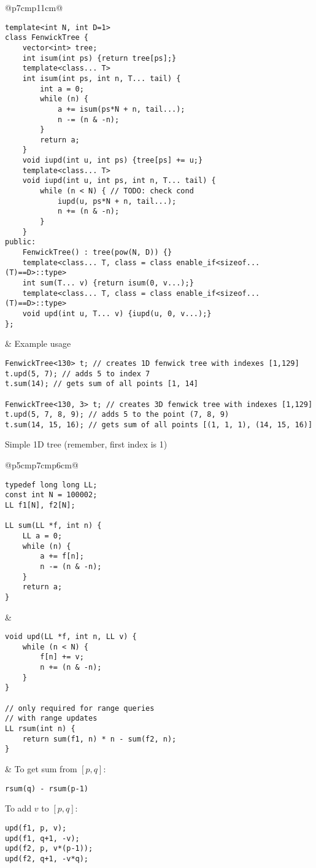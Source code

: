 \documentclass[letterpaper]{article}
\begin{document}
\begin{tabular}{@{}p{7cm}p{11cm}@{}}
\vspace*{-1em}
\begin{lstlisting}
template<int N, int D=1>
class FenwickTree {
	vector<int> tree;
	int isum(int ps) {return tree[ps];}
	template<class... T>
	int isum(int ps, int n, T... tail) {
		int a = 0;
		while (n) {
			a += isum(ps*N + n, tail...);
			n -= (n & -n);
		}
		return a;
	}
	void iupd(int u, int ps) {tree[ps] += u;}
	template<class... T>
	void iupd(int u, int ps, int n, T... tail) {
		while (n < N) { // TODO: check cond
			iupd(u, ps*N + n, tail...);
			n += (n & -n);
		}
	}
public:
	FenwickTree() : tree(pow(N, D)) {}
	template<class... T, class = class enable_if<sizeof...(T)==D>::type>
	int sum(T... v) {return isum(0, v...);}
	template<class... T, class = class enable_if<sizeof...(T)==D>::type>
	void upd(int u, T... v) {iupd(u, 0, v...);}
};
\end{lstlisting}
&
Example usage

\begin{lstlisting}
FenwickTree<130> t; // creates 1D fenwick tree with indexes [1,129]
t.upd(5, 7); // adds 5 to index 7
t.sum(14); // gets sum of all points [1, 14]

FenwickTree<130, 3> t; // creates 3D fenwick tree with indexes [1,129]
t.upd(5, 7, 8, 9); // adds 5 to the point (7, 8, 9)
t.sum(14, 15, 16); // gets sum of all points [(1, 1, 1), (14, 15, 16)]
\end{lstlisting}
\end{tabular}

Simple 1D tree (remember, first index is 1)

\begin{tabular}{@{}p{5cm}p{7cm}p{6cm}@{}}
\vspace*{-1em}
\begin{lstlisting}
typedef long long LL;
const int N = 100002;
LL f1[N], f2[N];

LL sum(LL *f, int n) {
	LL a = 0;
	while (n) {
		a += f[n];
		n -= (n & -n);
	}
	return a;
}
\end{lstlisting}
&
\vspace*{-1em}
\begin{lstlisting}
void upd(LL *f, int n, LL v) {
	while (n < N) {
		f[n] += v;
		n += (n & -n);
	}
}

// only required for range queries
// with range updates
LL rsum(int n) {
	return sum(f1, n) * n - sum(f2, n);
}
\end{lstlisting}
&
To get sum from $[p,q]$:
\begin{lstlisting}
rsum(q) - rsum(p-1)
\end{lstlisting}

To add $v$ to $[p,q]$:

\begin{lstlisting}
upd(f1, p, v);
upd(f1, q+1, -v);
upd(f2, p, v*(p-1));
upd(f2, q+1, -v*q);
\end{lstlisting}
\end{tabular}
\end{document}
